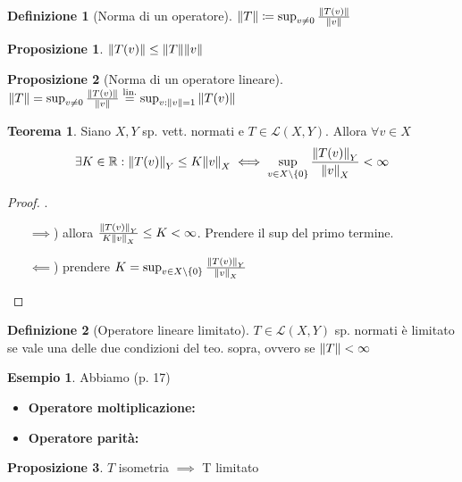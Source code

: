 \documentclass[a4paper,10pt]{article}
\theoremstyle{definition}
\newcommand{\re}{\mathbb{R}} %
\theoremstyle{indentdefinition}
\newtheorem{defn}{Definizione}[section]
\theoremstyle{indenttheorem}
\newtheorem{thm}{Teorema}
\newtheorem{prop}{Proposizione}
\theoremstyle{myremark}
\newtheorem{example*}{Esempio}
\theoremstyle{indentgeneral}
\newenvironment{myboxed} 
{\noindent\begin{lrbox}{\mybox}\begin{minipage}{\textwidth}}
{\end{minipage}\end{lrbox}\fbox{\usebox{\mybox}}}
\begin{document}
\begin{defn}[Norma di un operatore] $\norm{T}\coloneqq\sup_{v\ne0}\frac{\norm{T(v)}}{\norm{v}}$
\end{defn}

\begin{prop}
    $\norm{T(v)}\le \norm{T}\norm{v}$
\end{prop}

\begin{prop}[Norma di un operatore lineare] $\norm{T}=\sup_{v\ne0}\frac{\norm{T(v)}}{\norm{v}}\overset{\text{lin.}}{=}\sup_{v:\norm{v}=1}\norm{T(v)}$
\end{prop}

\begin{myboxed}
\begin{thm} Siano $X,Y$ sp. vett. normati e $T\in\mathcal{L}(X,Y)$. Allora $\forall v\in X$
$$\exists K\in\re: \norm{T(v)}_Y\le K\norm{v}_X\iff \sup_{v\in X\setminus\{0\}}\frac{\norm{T(v)}_Y}{\norm{v}_X}<\infty$$
\end{thm}
\end{myboxed}

\begin{proof}.
\begin{itemize}
    \item[$\implies$)] allora $\frac{\norm{T(v)}_Y}{ K\norm{v}_X}\le K<\infty$. Prendere il sup del primo termine.
    \item[$\impliedby$)] prendere $K= \sup_{v\in X\setminus\{0\}}\frac{\norm{T(v)}_Y}{\norm{v}_X}$
\end{itemize}
\end{proof}

\begin{defn}[Operatore lineare limitato]  $T\in\mathcal{L}(X,Y)$ sp. normati è limitato se vale una delle due condizioni del teo. sopra, ovvero se $\norm{T}<\infty$
\end{defn}

\begin{example*}
    Abbiamo (p. 17)
    \begin{itemize}
        \item \textbf{Operatore moltiplicazione:}
        \item \textbf{Operatore parità:}
    \end{itemize}
\end{example*}

\begin{prop}
    $T$ isometria $\implies$ T limitato
\end{prop}
\end{document}
